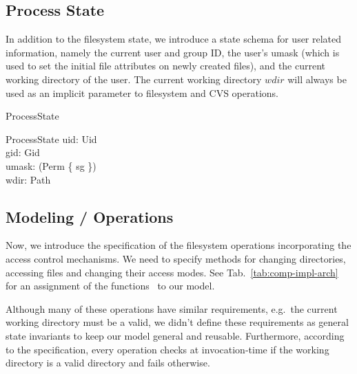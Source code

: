 \subsection{Process State}
In addition to the filesystem state, we introduce a state schema for user
related information, namely the current user and group ID, the user's umask
(which is used to set the initial file attributes on newly created files), and
the current working directory of the user.  The current working directory $wdir$
will always be used as an implicit parameter to filesystem and CVS operations.
\begin{doc}{ProcessState}
  \begin{schema}{ProcessState}
    uid: Uid \\
    gid: Gid \\
    umask: \power (Perm \setminus \{ sg \}) \\
    wdir: Path
  \end{schema}
\end{doc}


\subsection{Modeling \posix/\unix{} Operations}

Now, we introduce the specification of the filesystem operations
incorporating the access control mechanisms. We need to specify methods for
changing directories, accessing files and changing their access modes. See
Tab.~\ref{tab:comp-impl-arch} for an assignment of the \susv{} 
functions~\cite{open:unix:2002} to our model.

Although many of these operations have similar requirements, e.g.\ the current
working directory must be a valid,%
we didn't define these requirements as general state invariants to keep 
our model general and reusable.  Furthermore, according to the \susv{} 
specification, every operation checks at invocation-time if the working directory is 
a valid directory and fails otherwise.

